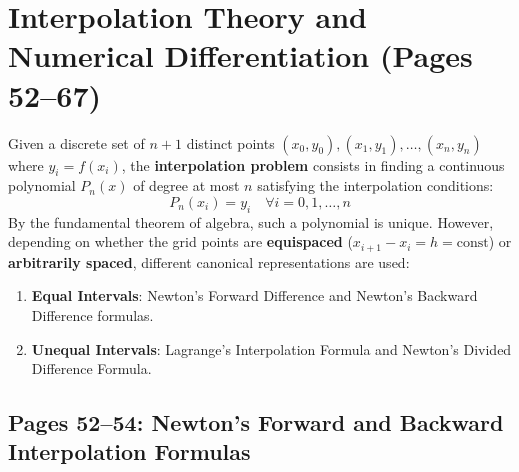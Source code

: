 \chapter{Interpolation Theory and Numerical Differentiation (Pages 52--67)}
\label{ch:interpolation}

\begin{conceptbox}
Given a discrete set of $n+1$ distinct points $(x_0, y_0), (x_1, y_1), \dots, (x_n, y_n)$ where $y_i = f(x_i)$, the \textbf{interpolation problem} consists in finding a continuous polynomial $P_n(x)$ of degree at most $n$ satisfying the interpolation conditions:
\begin{equation}
    P_n(x_i) = y_i \quad \forall i = 0, 1, \dots, n
\end{equation}
By the fundamental theorem of algebra, such a polynomial is unique. However, depending on whether the grid points are \textbf{equispaced} ($x_{i+1} - x_i = h = \text{const}$) or \textbf{arbitrarily spaced}, different canonical representations are used:
\begin{enumerate}[noitemsep]
    \item \textbf{Equal Intervals}: Newton's Forward Difference and Newton's Backward Difference formulas.
    \item \textbf{Unequal Intervals}: Lagrange's Interpolation Formula and Newton's Divided Difference Formula.
\end{enumerate}
\end{conceptbox}

\section{Pages 52--54: Newton's Forward and Backward Interpolation Formulas}
\label{sec:newton_forward_backward}

